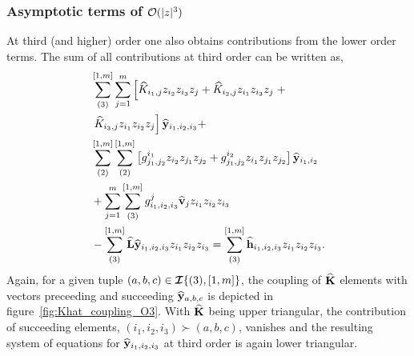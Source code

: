 \subsubsection{Asymptotic terms of $\mathcal{O}(|z|^{3})$}
\label{sec:normal_form_O3}

At third (and higher) order one also obtains contributions from the lower order terms.  The sum of all contributions at third order can be written as,
\begin{align}
	\label{eqn:asymptotic_O3}
	\begin{split}
		& \sum^{[1,m]}_{(3)}\sum^{m}_{j=1}\left[  
		\widehat{K}_{i_{1},j}z_{i_{2}}z_{i_{3}}z_{j} + 
		\widehat{K}_{i_{2},j}z_{i_{1}}z_{i_{3}}z_{j} 
		\right. + \\
		& \left.
		\widehat{K}_{i_{3},j}z_{i_{1}}z_{i_{2}}z_{j} \right]\widehat{\mathbf{y}}_{i_{1},i_{2},i_{3}} +  \\
		& \sum^{[1,m]}_{(2)}\sum^{[1,m]}_{(2)}\left[ 
		g^{i_{1}}_{j_{1},j_{2}}z_{i_{2}}z_{j_{1}}z_{j_{2}} + g^{i_{2}}_{j_{1},j_{2}}z_{i_{1}}z_{j_{1}}z_{j_{2}}
		\right]\widehat{\mathbf{y}}_{i_{1},i_{2}} \\
		& + \sum^{m}_{j=1}\sum^{[1,m]}_{(3)} g^{j}_{i_{1},i_{2},i_{3}}\widehat{\mathbf{v}}_{j}z_{i_{1}}z_{i_{2}}z_{i_{3}}  \\ 
		& - \sum^{[1,m]}_{(3)} \mathbf{\widehat{L}}\widehat{\mathbf{y}}_{i_{1},i_{2},i_{3}}z_{i_{1}}z_{i_{2}}z_{i_{3}} = \sum^{[1,m]}_{(3)} \widehat{\mathbf{h}}_{i_{1},i_{2},i_{3}}z_{i_{1}}z_{i_{2}}z_{i_{3}}.
	\end{split} 
\end{align}
Again, for a given tuple $(a,b,c)\in\bm{\mathcal{I}}\{(3),[1,m]\}$, the coupling of $\mathbf{\widehat{K}}$ elements with vectors preceeding and succeeding $\widehat{\mathbf{y}}_{a,b,c}$ is depicted in figure~\ref{fig:Khat_coupling_O3}. With $\mathbf{\widehat{K}}$ being upper triangular, the contribution of succeeding elements, $(i_{1},i_{2},i_{3})\succ (a,b,c)$, vanishes and the resulting system of equations for $\widehat{\mathbf{y}}_{i_{1},i_{2},i_{3}}$ at third order is again lower triangular.


